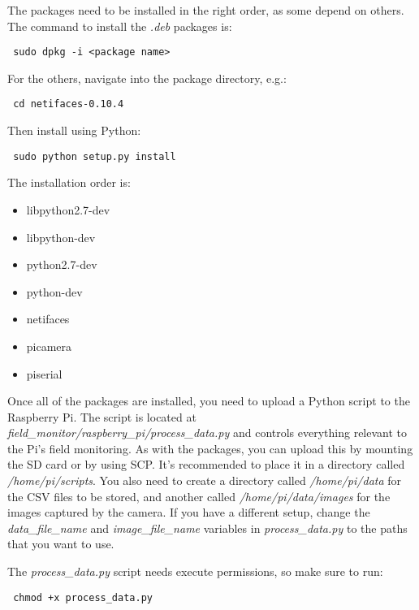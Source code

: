 \documentclass[10pt]{article}
\begin{document}
The packages need to be installed in the right order, as some depend on others. The command to install the \textit{.deb} packages is:

\begin{verbatim}
 sudo dpkg -i <package name>
\end{verbatim}

For the others, navigate into the package directory, e.g.:

\begin{verbatim}
 cd netifaces-0.10.4
\end{verbatim}

Then install using Python:

\begin{verbatim}
 sudo python setup.py install
\end{verbatim}

The installation order is:

\begin{itemize}
 \item libpython2.7-dev
 \item libpython-dev 
 \item python2.7-dev 
 \item python-dev 
 \item netifaces
 \item picamera
 \item piserial
\end{itemize}

Once all of the packages are installed, you need to upload a Python script to the Raspberry Pi. The script is located at
\textit{field\_monitor/raspberry\_pi/process\_data.py} and controls everything relevant to the Pi's field monitoring. As with the packages, you can upload this by
mounting the SD card or by using SCP. It's recommended to place it in a directory called \textit{/home/pi/scripts}. You also need to create a directory called
\textit{/home/pi/data} for the CSV files to be stored, and another called \textit{/home/pi/data/images} for the images captured by the camera. If you have a different
setup, change the \textit{data\_file\_name} and \textit{image\_file\_name} variables in \textit{process\_data.py} to the paths that you want to use.

The \textit{process\_data.py} script needs execute permissions, so make sure to run:

\begin{verbatim}
 chmod +x process_data.py
\end{verbatim}
\end{document}
